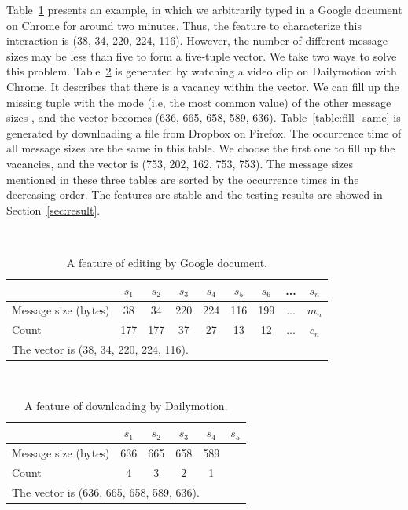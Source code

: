 Table~\ref{table:feature_doc} presents an example, in which we arbitrarily typed in a Google document on Chrome for around two minutes. Thus, the feature to characterize this interaction is (38, 34, 220, 224, 116). However, the number of different message sizes may be less than five to form a five-tuple vector. We take two ways to solve this problem. Table~\ref{table:fill_max} is generated by watching a video clip on Dailymotion with Chrome. It describes that there is a vacancy within the vector. We can fill up the missing tuple with the mode (i.e, the most common value) of the other message sizes \cite{DM}, and the vector becomes (636, 665, 658, 589, 636). Table~\ref{table:fill_same} is generated by downloading a file from Dropbox on Firefox. The occurrence time of all message sizes are the same in this table. We choose the first one to fill up the vacancies, and the vector is (753, 202, 162, 753, 753). The message sizes mentioned in these three tables are sorted by the occurrence times in the decreasing order. The features are stable and the testing results are showed in Section~\ref{sec:result}.

\
\begin{table}[H]
\centering
\caption{A feature of editing by Google document.}
\begin{tabular}{|l|c|c|c|c|c|c|c|c|}
\hline  & $s_1$ & $s_2$ & $s_3$ & $s_4$ & $s_5$ & $s_6$ & ... & $s_n$\\
\hline
\hline Message size (bytes) & 38 & 34 & 220 & 224 & 116 & 199 & ... & $m_n$ \\
\hline Count & 177 & 177 & 37 & 27 & 13 & 12 & ... & $c_n$\\
\hline 
\multicolumn{9}{l}{The vector is (38, 34, 220, 224, 116).}\\
\end{tabular}
\label{table:feature_doc}
\end{table}

\
\begin{table}[H]
\centering
\caption{A feature of downloading by Dailymotion.}
\begin{tabular}{|l|c|c|c|c|c|}
\hline  & $s_1$ & $s_2$ & $s_3$ & $s_4$ & $s_5$ \\
\hline
\hline Message size (bytes) & 636 & 665 & 658 & 589 &\\
\hline Count & 4 & 3 & 2 & 1 &\\
\hline
\multicolumn{6}{l}{The vector is (636, 665, 658, 589, 636).}\\ 
\end{tabular}
\label{table:fill_max}
\end{table}

